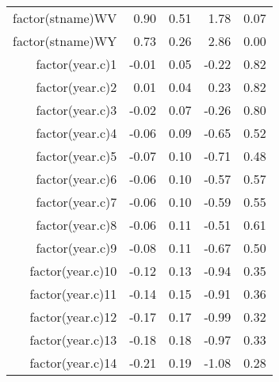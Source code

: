 \begin{table}[ht]
\begin{tabular}{rrrrr}
  factor(stname)WV & 0.90 & 0.51 & 1.78 & 0.07 \\ 
  factor(stname)WY & 0.73 & 0.26 & 2.86 & 0.00 \\ 
  factor(year.c)1 & -0.01 & 0.05 & -0.22 & 0.82 \\ 
  factor(year.c)2 & 0.01 & 0.04 & 0.23 & 0.82 \\ 
  factor(year.c)3 & -0.02 & 0.07 & -0.26 & 0.80 \\ 
  factor(year.c)4 & -0.06 & 0.09 & -0.65 & 0.52 \\ 
  factor(year.c)5 & -0.07 & 0.10 & -0.71 & 0.48 \\ 
  factor(year.c)6 & -0.06 & 0.10 & -0.57 & 0.57 \\ 
  factor(year.c)7 & -0.06 & 0.10 & -0.59 & 0.55 \\ 
  factor(year.c)8 & -0.06 & 0.11 & -0.51 & 0.61 \\ 
  factor(year.c)9 & -0.08 & 0.11 & -0.67 & 0.50 \\ 
  factor(year.c)10 & -0.12 & 0.13 & -0.94 & 0.35 \\ 
  factor(year.c)11 & -0.14 & 0.15 & -0.91 & 0.36 \\ 
  factor(year.c)12 & -0.17 & 0.17 & -0.99 & 0.32 \\ 
  factor(year.c)13 & -0.18 & 0.18 & -0.97 & 0.33 \\ 
  factor(year.c)14 & -0.21 & 0.19 & -1.08 & 0.28 \\ 
   \hline
\end{tabular}
\end{table}
